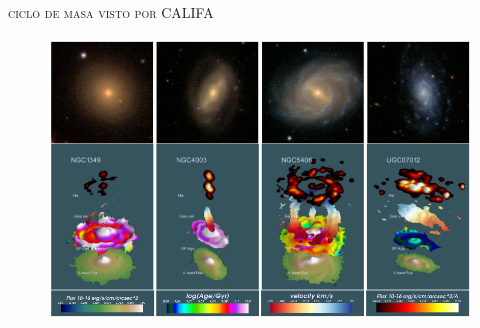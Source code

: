 \documentclass[xcolor=dvipsnames,fleqn,hyperref={colorlinks,citecolor=black,linkcolor=black,urlcolor=black}]{beamer}
\begin{document}
\begin{frame}{\textsc{ciclo de masa visto por CALIFA}}
%
\begin{figure}
\includegraphics[scale=1]{img/husemann2013-20}
\end{figure}
%
\end{frame}
\end{document}
